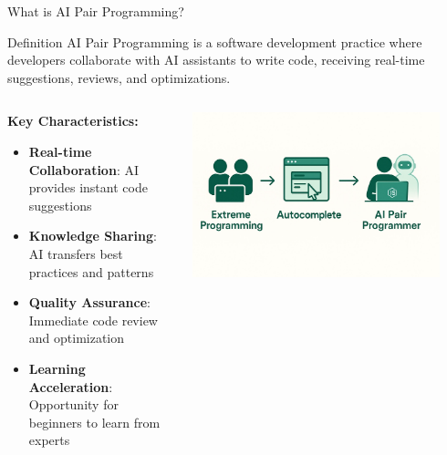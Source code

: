 \documentclass{beamer}
\begin{document}
\begin{frame}[t]{What is AI Pair Programming?}
    \begin{block}{Definition}
        AI Pair Programming is a software development practice where developers collaborate with AI assistants to write code, receiving real-time suggestions, reviews, and optimizations.
    \end{block}
    
    \begin{columns}
        \begin{column}{0.6\textwidth}
            \textbf{Key Characteristics:}
            \begin{itemize}
                \item \textbf{Real-time Collaboration}: AI provides instant code suggestions
                \item \textbf{Knowledge Sharing}: AI transfers best practices and patterns
                \item \textbf{Quality Assurance}: Immediate code review and optimization
                \item \textbf{Learning Acceleration}: Opportunity for beginners to learn from experts
            \end{itemize}
        \end{column}
        \begin{column}{0.4\textwidth}
            \centering
            \includegraphics[width=0.9\textwidth]{images/ai-pair-programming.png}
        \end{column}
    \end{columns}
\end{frame}
\end{document}
